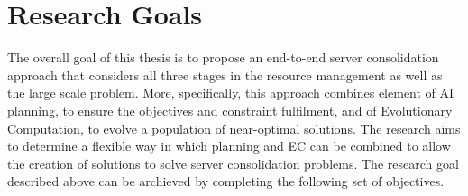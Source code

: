 \section{Research Goals}
The overall goal of this thesis is to propose an end-to-end server consolidation approach that considers all three stages in the resource management as well as the large scale problem. More, specifically, this approach combines element of AI planning, to ensure the objectives and constraint fulfilment, and of Evolutionary Computation, to evolve a population of near-optimal solutions. The research aims to determine a flexible way in which planning and EC can be combined to allow the creation of solutions to solve server consolidation problems. The research goal described above can be archieved by completing the following set of objectives. 


